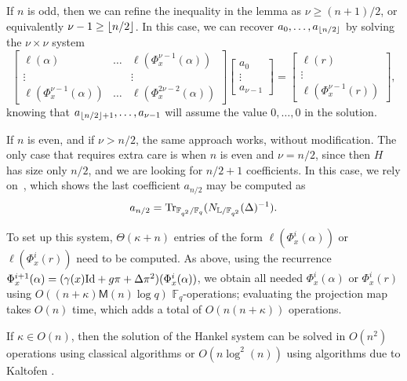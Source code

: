\documentclass[sigconf]{acmart}
\newcommand{\M}{\mathsf{M}}
\newcommand{\F}{\mathbb{F}}
\renewcommand{\L}{\mathbb{L}}
\newcommand{\minpol}{\textnormal{MinPoly}_{\mathbb{F}_q}}
\DeclarePairedDelimiter\floor{\lfloor}{\rfloor}
\begin{document}
If $n$ is odd, then we can refine the inequality in the lemma as $\nu
\ge (n+1)/2$, or equivalently $\nu-1 \ge \floor*{n/2}$. In this case,
we can recover $a_0,\dots,a_{\floor*{n/2}}$ by solving the $\nu \times \nu$ system
\[\begin{bmatrix}
   \ell(\alpha) & \ldots & \ell(\Phi_x^{\nu-1}(\alpha)) \\
    \vdots & & \vdots  \\ 
  \ell(\Phi_x^{\nu-1}(\alpha)) &  \ldots & \ell(\Phi_x^{2\nu-2}(\alpha))
\end{bmatrix} 
\begin{bmatrix} a_0  \\ \vdots \\ a_{\nu-1} \end{bmatrix} 
= 
\begin{bmatrix} \ell(r) \\ \vdots \\   \ell(\Phi_x^{\nu-1}(r)) \end{bmatrix}, \]
knowing that $a_{\floor*{n/2}+1},\dots,a_{\nu-1}$ will assume the value $0,\dots,0$
in the solution.

If $n$ is even, and if $\nu > n/2$, the same approach works, without
modification. The only case that requires extra care is when $n$ is
even and $\nu = n/2$, since then $H$ has size only $n/2$, and we are
looking for $n/2 + 1$ coefficients. In this case, we rely
on~\cite[Prop.~2.14]{frobdist}, which shows the last coefficient
$a_{n/2}$ may be computed as
\[a_{n/2} = {\rm Tr}_{\F_{q^2}/\F_{q}}(N_{\L/\F_{q^2}}(\Delta)^{-1}).\]

To set up this system, $\Theta(\kappa + n)$ entries of the form
$\ell(\Phi_x^i(\alpha))$ or $\ell(\Phi_x^i(r))$ need to be
computed. As above, using the recurrence $\Phi_x^{i+1}(\alpha) =
(\gamma(x) {\rm Id} + g\pi + \Delta \pi^2)(\Phi_x^i(\alpha))$, we
obtain all needed $\Phi_x^i(\alpha)$ or $\Phi_x^i(r)$ using $O((n +
\kappa)\M(n)\log q)$ $\F_q$-operations; evaluating the projection map
takes $O(n)$ time, which adds a total of $O(n(n+\kappa))$ operations.

If $\kappa \in O(n)$, then the solution of the Hankel system can be
solved in $O(n^2)$ operations using classical algorithms or $O(n
\log^2(n))$ using algorithms due to Kaltofen \cite{kaltofen1994}. 



\end{document}
